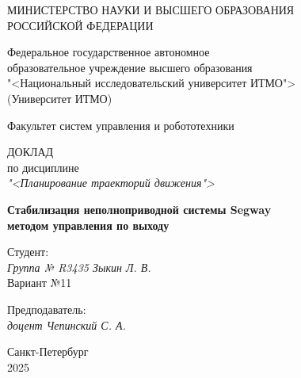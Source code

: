 \thispagestyle{empty}

\begin{center}
    МИНИСТЕРСТВО НАУКИ И ВЫСШЕГО ОБРАЗОВАНИЯ \\ РОССИЙСКОЙ ФЕДЕРАЦИИ

    \vspace{20pt}

    Федеральное государственное автономное \\ образовательное учреждение высшего образования \\
    "<Национальный исследовательский университет ИТМО"> \\
    (Университет ИТМО)

    \vspace{20pt}

    Факультет систем управления и робототехники
\end{center}

\vfill

\begin{center}
    ДОКЛАД\\  
    по дисциплине \\
    \textit{"<Планирование траекторий движения">}

    \vspace{20pt}

    \textbf{Стабилизация неполноприводной системы Segway \\ методом управления по выходу}
    
\end{center}

\vfill

    \noindent Студент: \\
    \textit{Группа № R3435 \hfill Зыкин Л. В.} \\
    
    \noindent Вариант №11 \\

    \vspace{20pt}

    \noindent Предподаватель: \\
    \textit{доцент \hfill Чепинский С. А.}

\vfill

\begin{center}
    Санкт-Петербург \\ 2025
\end{center}
